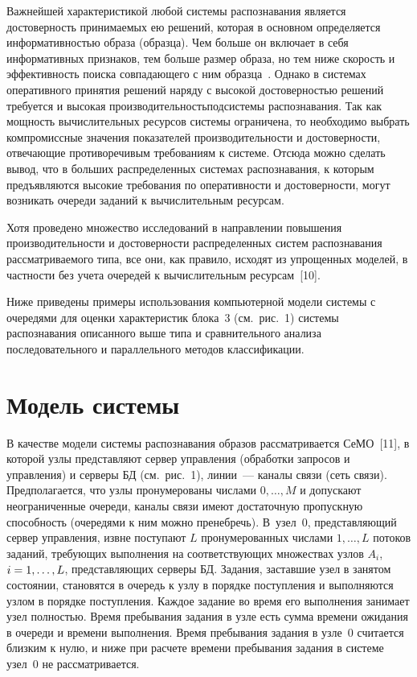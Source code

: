 \begin{multicols}{2}
Важнейшей характеристикой любой системы распознавания является
достоверность при\-ни\-ма\-емых ею решений, которая в основном определяется
информативностью образа (образца). Чем больше он включает в себя
информативных признаков, тем больше размер образа, но тем ниже скорость и
эффективность поиска совпадающего с ним образца~\cite{2-aga, 9-aga}. Однако
в системах оперативного принятия решений наряду с высокой достоверностью
решений требуется и высокая производительность\linebreak подсистемы распознавания.
Так как мощность вычислительных ресурсов системы ограничена, то
необходимо выбрать компромиссные значения показателей
производительности и достоверности, отвеча\-ющие противоречивым
требованиям к сис\-те\-ме. Отсюда можно сделать вывод, что в больших
распределенных сис\-те\-мах распознавания, к которым предъявляются высокие
требования по оперативности и достоверности, могут возникать очереди
заданий к вычислительным ресурсам.

Хотя проведено множество исследований в направлении повышения
производительности и достоверности распределенных систем распознавания
рассматриваемого типа, все они, как правило, исходят из упрощенных моделей,
в частности без учета очередей к вычислительным ресурсам~[10].

Ниже приведены примеры использования компьютерной модели системы с
очередями для оценки характеристик блока~3 (см.\ рис.~1) системы
распознавания описанного выше типа и сравнительного анализа
последовательного и параллельного методов классификации.

\vspace*{-9pt}

\section{Модель системы}

\vspace*{-2pt}

В качестве модели системы распознавания образов рассматривается
СеМО~[11], в которой узлы представляют сервер
управления (обработки запросов и управления) и серверы БД (см.\ рис.~1),
линии~--- каналы связи (сеть связи). Предполагается, что узлы пронумерованы
числами $0, \ldots , M$ и допускают неограниченные очереди, каналы связи
имеют достаточную пропускную способность (очередями к ним можно
пренебречь). В~узел~0, представляющий сервер управления, извне поступают
$L$ пронумерованных числами $1, \ldots , L$ потоков заданий, требующих
выполнения на соответствующих множествах узлов $A_i$, $i\hm= 1,\ldots , L$,
представляющих серверы БД. Задания, заставшие узел в занятом состоянии,
становятся в очередь к узлу в порядке поступления и выполняются узлом в
порядке поступления. Каж\-дое задание во время его выполнения занимает узел
полностью. Время пребывания задания в узле есть сумма времени ожидания в
очереди и времени выполнения. Время пребывания задания в узле~0 считается
близким к нулю, и ниже при расчете времени пребывания задания в системе
узел~0 не рассматривается.


\end{multicols}
